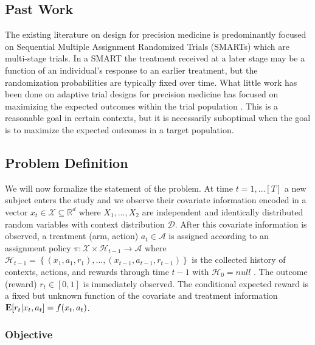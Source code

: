 \documentclass[12pt,,letterpaper,twoside]{report}
\DeclareMathOperator{\E}{{\rm I\kern-.3em E}}
\begin{document}
\hypertarget{past-work}{%
\subsection{Past Work}\label{past-work}}

The existing literature on design for precision medicine is
predominantly focused on Sequential Multiple Assignment Randomized
Trials (SMARTs) \citep{lei2012smart, kosorok2015adaptive} which are
multi-stage trials. In a SMART the treatment received at a later stage
may be a function of an individual's response to an earlier treatment,
but the randomization probabilities are typically fixed over time. What
little work has been done on adaptive trial designs for precision
medicine has focused on maximizing the expected outcomes within the
trial population \citep{guo2017subgroup}. This is a reasonable goal in
certain contexts, but it is necessarily suboptimal when the goal is to
maximize the expected outcomes in a target population.

\hypertarget{problem-definition}{%
\subsection{Problem Definition}\label{problem-definition}}

We will now formalize the statement of the problem. At time
\(t = 1, \ldots [T]\) a new subject enters the study and we observe
their covariate information encoded in a vector
\(x_t \in \mathcal{X} \subseteq \mathbb{R}^d\) where
\(X_1, \ldots, X_2\) are independent and identically distributed random
variables with context distribution \(\mathcal{D}\). After this
covariate information is observed, a treatment (arm, action)
\(a_t \in \mathcal{A}\) is assigned according to an assignment policy
\(\pi: \mathcal{X} \times \mathcal{H}_{t-1} \to \mathcal{A}\) where
\(\mathcal{H}_{t-1} = \left\{(x_1, a_1, r_1), \ldots, (x_{t - 1}, a_{t - 1}, r_{t -1})\right\}\)
is the collected history of contexts, actions, and rewards through time
\(t-1\) with \(\mathcal{H}_0 = null\) . The outcome (reward)
\(r_t \in [0,1]\) is immediately observed. The conditional expected
reward is a fixed but unknown function of the covariate and treatment
information \(\E[r_t |x_t, a_t] = f(x_t, a_t)\).

\hypertarget{objective}{%
\subsubsection{Objective}\label{objective}}
\end{document}

